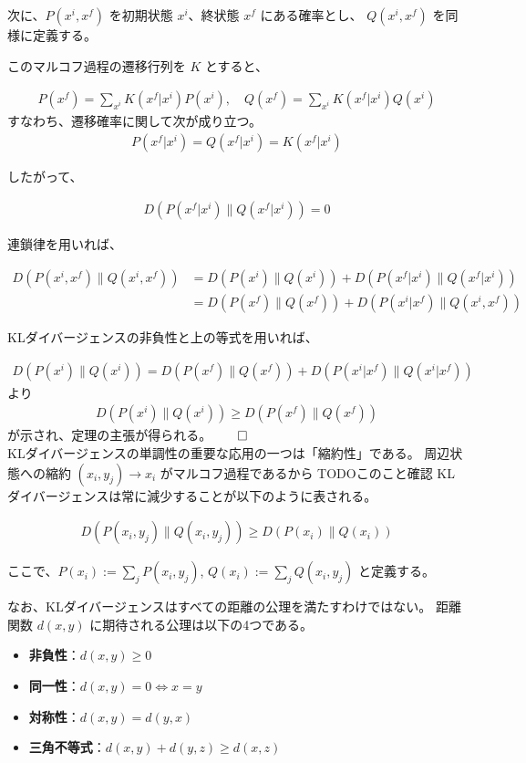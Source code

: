 \documentclass[a4paper,11pt]{jsarticle}
\numberwithin{equation}{section}
\begin{document}
次に、$P(x^i, x^f)$ を初期状態 $x^i$、終状態 $x^f$ にある確率とし、
$Q(x^i, x^f)$ を同様に定義する。

このマルコフ過程の遷移行列を $K$ とすると、

\begin{align}
P(x^f) = \sum_{x^i} K(x^f | x^i) P(x^i), \quad
Q(x^f) = \sum_{x^i} K(x^f | x^i) Q(x^i)
\end{align}
すなわち、遷移確率に関して次が成り立つ。
\begin{align}
P(x^f | x^i) = Q(x^f | x^i) = K(x^f | x^i)
\end{align}

したがって、

\begin{align}
D(P(x^f | x^i) \| Q(x^f | x^i)) = 0
\end{align}

連鎖律を用いれば、

\begin{align}
D(P(x^i, x^f) \| Q(x^i, x^f))
&= D(P(x^i) \| Q(x^i)) + D(P(x^f | x^i) \| Q(x^f | x^i)) \\
&= D(P(x^f) \| Q(x^f)) + D(P(x^i| x^f) \| Q(x^i, x^f))
\end{align}

KLダイバージェンスの非負性と上の等式を用いれば、

\begin{align}
    D(P(x^i) \| Q(x^i)) = D(P(x^f) \| Q(x^f)) + D(P(x^i | x^f) \| Q(x^i | x^f))
\end{align}
より
\begin{align}
D(P(x^i) \| Q(x^i)) \geq D(P(x^f) \| Q(x^f))
\end{align}
が示され、定理の主張が得られる。$\qed$\\

KLダイバージェンスの単調性の重要な応用の一つは「縮約性」である。
周辺状態への縮約 $(x_i, y_j) \to x_i$ がマルコフ過程であるから
TODOこのこと確認
KLダイバージェンスは常に減少することが以下のように表される。

\begin{align}
D(P(x_i, y_j) \| Q(x_i, y_j)) \geq D(P(x_i) \| Q(x_i))
\end{align}

ここで、$P(x_i) := \sum_j P(x_i, y_j)$, $Q(x_i) := \sum_j Q(x_i, y_j)$ と定義する。

なお、KLダイバージェンスはすべての距離の公理を満たすわけではない。
距離関数 $d(x, y)$ に期待される公理は以下の4つである。

\begin{itemize}
  \item \textbf{非負性}：$d(x, y) \geq 0$
  \item \textbf{同一性}：$d(x, y) = 0 \iff x = y$
  \item \textbf{対称性}：$d(x, y) = d(y, x)$
  \item \textbf{三角不等式}：$d(x, y) + d(y, z) \geq d(x, z)$
\end{itemize}
\end{document}
